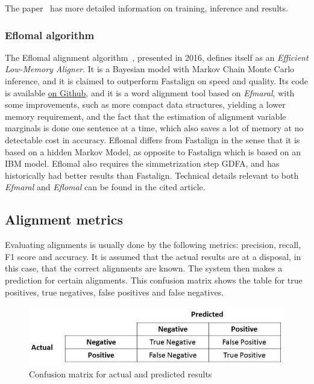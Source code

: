 The paper~\cite{dyer-etal-2013-simple} has more detailed information on training, inference and results.

\subsubsection{Eflomal algorithm}

The Eflomal alignment algorithm~\cite{ostling2016efficient}, presented in 2016, defines itself as an \emph{Efficient Low-Memory Aligner}. It is a Bayesian model with Markov Chain Monte Carlo inference, and it is claimed to outperform Fastalign on speed and quality. Its code is available \href{https://github.com/robertostling/eflomal}{on Github}, and it is a word alignment tool based on \emph{Efmaral}, with some improvements, such as more compact data structures, yielding a lower memory requirement, and the fact that the estimation of alignment variable marginals is done one sentence at a time, which also saves a lot of memory at no detectable cost in accuracy. Eflomal differs from Fastalign in the sense that it is based on a hidden Markov Model, as opposite to Fastalign which is based on an IBM model. Eflomal also requires the simmetrization step GDFA, and has historically had better results than Fastalign. Technical details relevant to both \emph{Efmaral} and \emph{Eflomal} can be found in the cited article.

\subsection{Alignment metrics}\label{tra:metrics}

Evaluating alignments is usually done by the following metrics: precision, recall, F1 score and accuracy. It is assumed that the actual results are at a disposal, in this case, that the correct alignments are known. The system then makes a prediction for certain alignments. This confusion matrix shows the table for true positives, true negatives, false positives and false negatives.

\begin{figure}[!ht]
    \centering
    \includegraphics[width=12cm]{figures/precrec.jpeg}
    \caption{Confusion matrix for actual and predicted results}
\end{figure}

